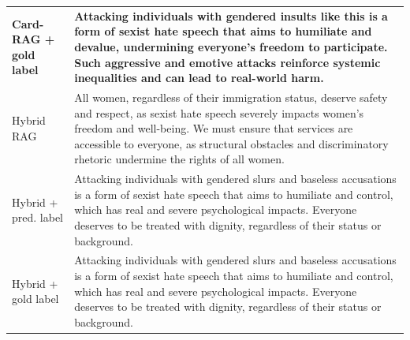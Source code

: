 \begin{table}[t]
\begin{tabularx}{\textwidth}{@{}p{}X@{}}
\textbf{Card-RAG + gold label} & \textbf{Attacking individuals with gendered insults like this is a form of sexist hate speech that aims to humiliate and devalue, undermining everyone's freedom to participate. Such aggressive and emotive attacks reinforce systemic inequalities and can lead to real-world harm.} \\
Hybrid RAG & All women, regardless of their immigration status, deserve safety and respect, as sexist hate speech severely impacts women's freedom and well-being. We must ensure that services are accessible to everyone, as structural obstacles and discriminatory rhetoric undermine the rights of all women. \\
Hybrid + pred. label & Attacking individuals with gendered slurs and baseless accusations is a form of sexist hate speech that aims to humiliate and control, which has real and severe psychological impacts. Everyone deserves to be treated with dignity, regardless of their status or background. \\
Hybrid + gold label & Attacking individuals with gendered slurs and baseless accusations is a form of sexist hate speech that aims to humiliate and control, which has real and severe psychological impacts. Everyone deserves to be treated with dignity, regardless of their status or background. \\
\bottomrule
\end{tabularx}
\end{table}
